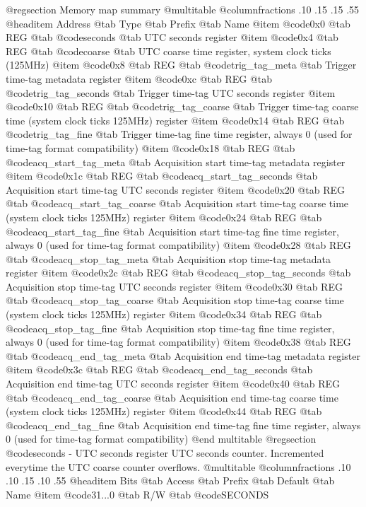 @regsection Memory map summary
@multitable  @columnfractions .10 .15 .15 .55
@headitem Address @tab Type @tab Prefix @tab Name
@item @code{0x0} @tab
REG @tab
@code{seconds} @tab
UTC seconds register
@item @code{0x4} @tab
REG @tab
@code{coarse} @tab
UTC coarse time register, system clock ticks (125MHz)
@item @code{0x8} @tab
REG @tab
@code{trig_tag_meta} @tab
Trigger time-tag metadata register
@item @code{0xc} @tab
REG @tab
@code{trig_tag_seconds} @tab
Trigger time-tag UTC seconds register
@item @code{0x10} @tab
REG @tab
@code{trig_tag_coarse} @tab
Trigger time-tag coarse time (system clock ticks 125MHz) register
@item @code{0x14} @tab
REG @tab
@code{trig_tag_fine} @tab
Trigger time-tag fine time register, always 0 (used for time-tag format compatibility)
@item @code{0x18} @tab
REG @tab
@code{acq_start_tag_meta} @tab
Acquisition start time-tag metadata register
@item @code{0x1c} @tab
REG @tab
@code{acq_start_tag_seconds} @tab
Acquisition start time-tag UTC seconds register
@item @code{0x20} @tab
REG @tab
@code{acq_start_tag_coarse} @tab
Acquisition start time-tag coarse time (system clock ticks 125MHz) register
@item @code{0x24} @tab
REG @tab
@code{acq_start_tag_fine} @tab
Acquisition start time-tag fine time register, always 0 (used for time-tag format compatibility)
@item @code{0x28} @tab
REG @tab
@code{acq_stop_tag_meta} @tab
Acquisition stop time-tag metadata register
@item @code{0x2c} @tab
REG @tab
@code{acq_stop_tag_seconds} @tab
Acquisition stop time-tag UTC seconds register
@item @code{0x30} @tab
REG @tab
@code{acq_stop_tag_coarse} @tab
Acquisition stop time-tag coarse time (system clock ticks 125MHz) register
@item @code{0x34} @tab
REG @tab
@code{acq_stop_tag_fine} @tab
Acquisition stop time-tag fine time register, always 0 (used for time-tag format compatibility)
@item @code{0x38} @tab
REG @tab
@code{acq_end_tag_meta} @tab
Acquisition end time-tag metadata register
@item @code{0x3c} @tab
REG @tab
@code{acq_end_tag_seconds} @tab
Acquisition end time-tag UTC seconds register
@item @code{0x40} @tab
REG @tab
@code{acq_end_tag_coarse} @tab
Acquisition end time-tag coarse time (system clock ticks 125MHz) register
@item @code{0x44} @tab
REG @tab
@code{acq_end_tag_fine} @tab
Acquisition end time-tag fine time register, always 0 (used for time-tag format compatibility)
@end multitable 
@regsection @code{seconds} - UTC seconds register
UTC seconds counter. Incremented everytime the UTC coarse counter overflows.
@multitable @columnfractions .10 .10 .15 .10 .55
@headitem Bits @tab Access @tab Prefix @tab Default @tab Name
@item @code{31...0}
@tab R/W @tab
@code{SECONDS}
